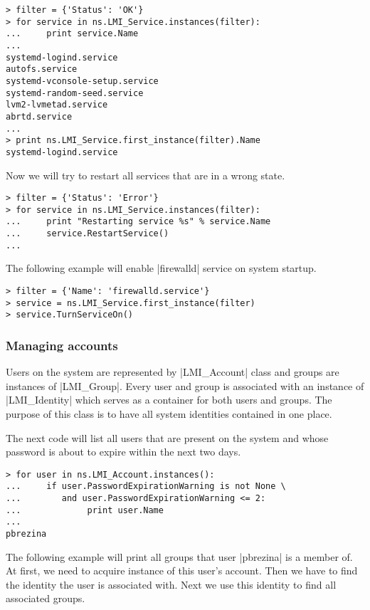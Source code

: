 \begin{lstlisting}[]
> filter = {'Status': 'OK'}
> for service in ns.LMI_Service.instances(filter):
...     print service.Name
... 
systemd-logind.service
autofs.service
systemd-vconsole-setup.service
systemd-random-seed.service
lvm2-lvmetad.service
abrtd.service
...
> print ns.LMI_Service.first_instance(filter).Name
systemd-logind.service
\end{lstlisting}
\funclistend
Now we will try to restart all services that are in a wrong state.

\begin{lstlisting}[]
> filter = {'Status': 'Error'}
> for service in ns.LMI_Service.instances(filter):
...     print "Restarting service %s" % service.Name
...     service.RestartService()
... 
\end{lstlisting}
\funclistend
The following example will enable |firewalld| service on system startup.

\begin{lstlisting}[]
> filter = {'Name': 'firewalld.service'}
> service = ns.LMI_Service.first_instance(filter)
> service.TurnServiceOn() 
\end{lstlisting}

\subsubsection{Managing accounts}
\label{openlmi:shell:examples:accounts}

Users on the system are represented by |LMI_Account| class and groups are
instances of |LMI_Group|. Every user and group is associated with an instance of
|LMI_Identity| which serves as a container for both users and groups. The
purpose of this class is to have all system identities contained in one place.

The next code will list all users that are present on the system and
whose password is about to expire within the next two days.

\begin{lstlisting}[]
> for user in ns.LMI_Account.instances():
...     if user.PasswordExpirationWarning is not None \
...        and user.PasswordExpirationWarning <= 2:
...             print user.Name
... 
pbrezina 
\end{lstlisting}
\funclistend
The following example will print all groups that user |pbrezina| is a member of.
At first, we need to acquire instance of this user's account. Then we have to
find the identity the user is associated with. Next we use this identity to find
all associated groups.

